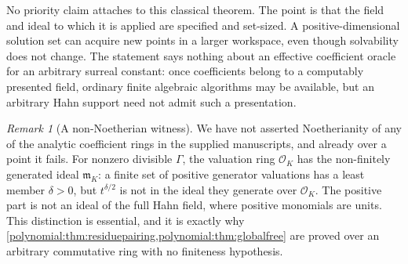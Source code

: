 \documentclass[11pt,letterpaper]{article}
\numberwithin{equation}{section}
\theoremstyle{definition}
\theoremstyle{remark}\newtheorem{remark}[theorem]{Remark}
\newcommand{\OO}{\mathcal O}
\newcommand{\mm}{\mathfrak m}
\begin{document}
No priority claim attaches to this classical theorem. The point is that the
field and ideal to which it is applied are specified and set-sized. A
positive-dimensional solution set can acquire new points in a larger
workspace, even though solvability does not change. The statement says nothing
about an effective coefficient oracle for an arbitrary surreal constant: once
coefficients belong to a computably presented field, ordinary finite
algebraic algorithms may be available, but an arbitrary Hahn support need not
admit such a presentation.

\begin{remark}[A non-Noetherian witness]\label{polynomial:rem:nonnoetherian}
We have not asserted Noetherianity of any of the analytic coefficient rings in
the supplied manuscripts, and already over a point it fails. For nonzero
divisible $\Gamma$, the valuation ring $\OO_K$ has the non-finitely generated
ideal $\mm_K$: a finite set of positive generator valuations has a least
member $\delta>0$, but $t^{\delta/2}$ is not in the ideal they generate over
$\OO_K$. The positive part is not an ideal of the full Hahn field, where
positive monomials are units. This distinction is essential, and it is exactly
why \cref{polynomial:thm:residuepairing,polynomial:thm:globalfree} are proved
over an arbitrary commutative ring with no finiteness hypothesis.
\end{remark}
\end{document}
